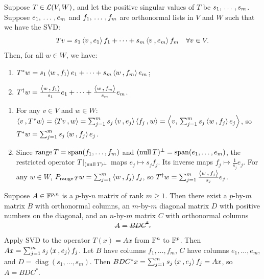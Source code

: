 \begin{thm}
  \label{thm: singular value decomposition of adjoint and pseudoinverse}
  Suppose $T \in \mathcal{L}(V,W)$, and let the positive singular values of $T$ be $s_1, {\, \ldots \,\,}, s_m$. Suppose $e_1, {\, \ldots \,\,}, e_m$ and $f_1, {\, \ldots \,\,}, f_m$ are orthonormal lists in $V$ and $W$ such that we have the SVD:
  \begin{equation}
    Tv = s_1 \ip{v}{e_1} f_1 + \cdots + s_m \ip{v}{e_m}f_m \quad \forall v \in V.
  \end{equation}
  Then, for all $w \in W$, we have:
  \begin{enumerate}[label=\textbf{(\alph*)}]
    \item $T^*w = s_1 \ip{w}{f_1}e_1 + \cdots + s_m \ip{w}{f_m}e_m$;
    \item $T^\dagger w = \frac{\ip{w}{f_1}}{s_1} e_1 + \cdots + \frac{\ip{w}{f_m}}{s_m} e_m$.
  \end{enumerate}
\end{thm}
\begin{prf}
  \begin{enumerate}[label=\textbf{(\alph*)}]
    \item For any $v \in V$ and $w \in W$: $\ip{v}{T^*w} = \ip{Tv}{w} = \sum_{j=1}^m s_j \ip{v}{e_j} \ip{f_j}{w} = \left\langle v, \, \sum_{j=1}^m s_j \ip{w}{f_j} e_j \right\rangle$, so $T^*w = \sum_{j=1}^m s_j \ip{w}{f_j} e_j$.
    \item Since $\operatorname{range} T = \operatorname{span} (f_1, \dots, f_m)$ and $(\operatorname{null} T)^\bot = \operatorname{span} (e_1, \dots, e_m)$, the restricted operator $T|_{(\operatorname{null} T)^\bot}$ maps $e_j \mapsto s_j f_j$. Its inverse maps $f_j \mapsto \frac{1}{s_j} e_j$.
    For any $w \in W$, $P_{\myrange T} w = \sum_{j=1}^m \ip{w}{f_j} f_j$, so $T^\dagger w = \sum_{j=1}^m \frac{\ip{w}{f_j}}{s_j} e_j$.
  \end{enumerate}
  \vspace{-\baselineskip}
\end{prf}

\begin{thm}
  Suppose $A \in \mathbb{F}^{p,n}$ is a $p$-by-$n$ matrix of rank $m \geq 1$. Then there exist a $p$-by-$m$ matrix $B$ with orthonormal columns, an $m$-by-$m$ diagonal matrix $D$ with positive numbers on the diagonal, and an $n$-by-$m$ matrix $C$ with orthonormal columns \st
  \begin{equation}
    A = BDC^*.
  \end{equation}
\end{thm}
\begin{prf}
  Apply SVD to the operator $T(x) = Ax$ from $\mathbb{F}^n$ to $\mathbb{F}^p$.
  Then $Ax = \sum_{j=1}^m s_j \ip{x}{e_j} f_j$.
  Let $B$ have columns $f_1, \dots, f_m$, $C$ have columns $e_1, \dots, e_m$, and $D = \operatorname{diag}(s_1, \dots, s_m)$.
  Then $BDC^* x = \sum_{j=1}^m s_j \ip{x}{e_j} f_j = Ax$, so $A = BDC^*$.
\end{prf}